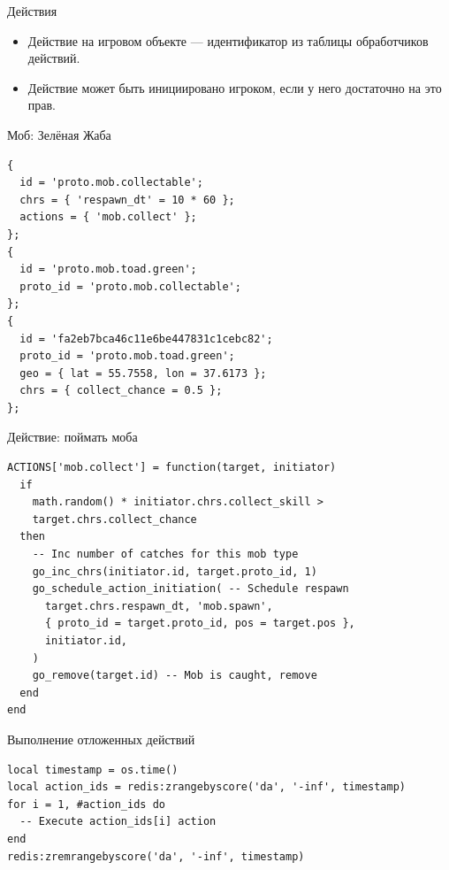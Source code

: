 \documentclass[aspectratio=169,handout,bigger]{beamer}
\begin{document}
\begin{frame}{Действия}
  \begin{itemize}
    \item Действие на игровом объекте --- идентификатор из таблицы
          обработчиков действий.
    \item Действие может быть инициировано игроком,
          если у него достаточно на это прав.
  \end{itemize}
\end{frame}


\begin{frame}[fragile]{Моб: Зелёная Жаба}
\begin{verbatim}
{
  id = 'proto.mob.collectable';
  chrs = { 'respawn_dt' = 10 * 60 };
  actions = { 'mob.collect' };
};
{
  id = 'proto.mob.toad.green';
  proto_id = 'proto.mob.collectable';
};
{
  id = 'fa2eb7bca46c11e6be447831c1cebc82';
  proto_id = 'proto.mob.toad.green';
  geo = { lat = 55.7558, lon = 37.6173 };
  chrs = { collect_chance = 0.5 };
};
\end{verbatim}
\end{frame}


\begin{frame}[fragile]{Действие: поймать моба}
\begin{verbatim}
ACTIONS['mob.collect'] = function(target, initiator)
  if
    math.random() * initiator.chrs.collect_skill >
    target.chrs.collect_chance
  then
    -- Inc number of catches for this mob type
    go_inc_chrs(initiator.id, target.proto_id, 1)
    go_schedule_action_initiation( -- Schedule respawn
      target.chrs.respawn_dt, 'mob.spawn',
      { proto_id = target.proto_id, pos = target.pos },
      initiator.id,
    )
    go_remove(target.id) -- Mob is caught, remove
  end
end
\end{verbatim}
\end{frame}


\begin{frame}[fragile]{Выполнение отложенных действий}
\begin{verbatim}
local timestamp = os.time()
local action_ids = redis:zrangebyscore('da', '-inf', timestamp)
for i = 1, #action_ids do
  -- Execute action_ids[i] action
end
redis:zremrangebyscore('da', '-inf', timestamp)
\end{verbatim}
\end{frame}
\end{document}

